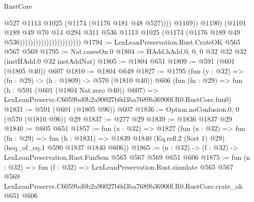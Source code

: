 \begin{lexlean}{RustCore}
\begin{coremodule}
                                                      @527
                                                      @1113
                                                      @1025
                                                      (@1174 (@1176 @181 @48 @527))))
                                                  @1169))
                                              @1190)
                                            (@1101
                                              @189
                                              @49
                                              @70
                                              @14
                                              @294
                                              @311
                                              @536
                                              @1113
                                              @1025
                                              (@1174 (@1176 @189 @49 @536)))))))))))))))))))))))
@1794 := LexLeanPreservation.Rust.CrateOK @565 @567 @569
@1795 := Nat.casesOn.{0}
@1804 := HAdd.hAdd.{0, 0, 0} @32 @32 @32 (instHAdd.{0} @32 instAddNat)
@1805 := @1804 @651
@1809 := @591 (@601 (@1805 @40)) @607
@1810 := @1804 @649
@1827 := @1795
    (fun (y : @32) => (fn : @29) -> (h : @1809) -> @570 (@1810 @40))
    @606
    (fun (fn : @29) =>
    fun (h : @591 (@601 (@1804 Nat.zero @40)) @607) =>
    LexLeanPreserve.C6059bd0b2a90027b0d3ba7689b36900f.R0.RustCore.fun0)
@1831 := @591 (@601 (@1805 @96)) @607
@1836 := Option.noConfusion.{0, 0} (@570 (@1810 @96)) @29
@1837 := @277 @29
@1839 := @1836 @1837 @29
@1840 := @605 @651
@1857 := fun (x : @32) =>
  @1827
    (fun (x : @32) =>
    fun (fn : @29) =>
    fun (h : @1831) => @1839 @1840 (Eq.refl.{2} (Sort 1) @29) (heq_of_eq.{1} @590 @1837 @1840 @606))
@1865 := (n : @32) -> (f : @32) -> LexLeanPreservation.Rust.FunSem @565 @567 @569 @651 @606
@1875 := fun (n : @32) =>
  fun (f : @32) =>
  LexLeanPreservation.Rust.simulate
    @565
    @567
    @569
    LexLeanPreserve.C6059bd0b2a90027b0d3ba7689b36900f.R0.RustCore.crate_ok
    @651
    @606
\end{coremodule}
\end{lexlean}
